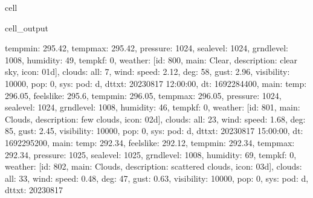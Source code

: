 \documentclass[letterpaper,10pt,english]{jupyterBook}
\begin{document}
\begin{sphinxuseclass}{cell}
\begin{sphinxVerbatimOutput}
\begin{sphinxuseclass}{cell_output}
\begin{sphinxVerbatim}[commandchars=\\\{\}]
\PYGZsq{}temp\PYGZus{}min\PYGZsq{}: 295.42, \PYGZsq{}temp\PYGZus{}max\PYGZsq{}: 295.42, \PYGZsq{}pressure\PYGZsq{}: 1024, \PYGZsq{}sea\PYGZus{}level\PYGZsq{}: 1024, \PYGZsq{}grnd\PYGZus{}level\PYGZsq{}: 1008, \PYGZsq{}humidity\PYGZsq{}: 49, \PYGZsq{}temp\PYGZus{}kf\PYGZsq{}: 0\PYGZcb{}, \PYGZsq{}weather\PYGZsq{}: [\PYGZob{}\PYGZsq{}id\PYGZsq{}: 800, \PYGZsq{}main\PYGZsq{}: \PYGZsq{}Clear\PYGZsq{}, \PYGZsq{}description\PYGZsq{}: \PYGZsq{}clear sky\PYGZsq{}, \PYGZsq{}icon\PYGZsq{}: \PYGZsq{}01d\PYGZsq{}\PYGZcb{}], \PYGZsq{}clouds\PYGZsq{}: \PYGZob{}\PYGZsq{}all\PYGZsq{}: 7\PYGZcb{}, \PYGZsq{}wind\PYGZsq{}: \PYGZob{}\PYGZsq{}speed\PYGZsq{}: 2.12, \PYGZsq{}deg\PYGZsq{}: 58, \PYGZsq{}gust\PYGZsq{}: 2.96\PYGZcb{}, \PYGZsq{}visibility\PYGZsq{}: 10000, \PYGZsq{}pop\PYGZsq{}: 0, \PYGZsq{}sys\PYGZsq{}: \PYGZob{}\PYGZsq{}pod\PYGZsq{}: \PYGZsq{}d\PYGZsq{}\PYGZcb{}, \PYGZsq{}dt\PYGZus{}txt\PYGZsq{}: \PYGZsq{}2023\PYGZhy{}08\PYGZhy{}17 12:00:00\PYGZsq{}\PYGZcb{}, \PYGZob{}\PYGZsq{}dt\PYGZsq{}: 1692284400, \PYGZsq{}main\PYGZsq{}: \PYGZob{}\PYGZsq{}temp\PYGZsq{}: 296.05, \PYGZsq{}feels\PYGZus{}like\PYGZsq{}: 295.6, \PYGZsq{}temp\PYGZus{}min\PYGZsq{}: 296.05, \PYGZsq{}temp\PYGZus{}max\PYGZsq{}: 296.05, \PYGZsq{}pressure\PYGZsq{}: 1024, \PYGZsq{}sea\PYGZus{}level\PYGZsq{}: 1024, \PYGZsq{}grnd\PYGZus{}level\PYGZsq{}: 1008, \PYGZsq{}humidity\PYGZsq{}: 46, \PYGZsq{}temp\PYGZus{}kf\PYGZsq{}: 0\PYGZcb{}, \PYGZsq{}weather\PYGZsq{}: [\PYGZob{}\PYGZsq{}id\PYGZsq{}: 801, \PYGZsq{}main\PYGZsq{}: \PYGZsq{}Clouds\PYGZsq{}, \PYGZsq{}description\PYGZsq{}: \PYGZsq{}few clouds\PYGZsq{}, \PYGZsq{}icon\PYGZsq{}: \PYGZsq{}02d\PYGZsq{}\PYGZcb{}], \PYGZsq{}clouds\PYGZsq{}: \PYGZob{}\PYGZsq{}all\PYGZsq{}: 23\PYGZcb{}, \PYGZsq{}wind\PYGZsq{}: \PYGZob{}\PYGZsq{}speed\PYGZsq{}: 1.68, \PYGZsq{}deg\PYGZsq{}: 85, \PYGZsq{}gust\PYGZsq{}: 2.45\PYGZcb{}, \PYGZsq{}visibility\PYGZsq{}: 10000, \PYGZsq{}pop\PYGZsq{}: 0, \PYGZsq{}sys\PYGZsq{}: \PYGZob{}\PYGZsq{}pod\PYGZsq{}: \PYGZsq{}d\PYGZsq{}\PYGZcb{}, \PYGZsq{}dt\PYGZus{}txt\PYGZsq{}: \PYGZsq{}2023\PYGZhy{}08\PYGZhy{}17 15:00:00\PYGZsq{}\PYGZcb{}, \PYGZob{}\PYGZsq{}dt\PYGZsq{}: 1692295200, \PYGZsq{}main\PYGZsq{}: \PYGZob{}\PYGZsq{}temp\PYGZsq{}: 292.34, \PYGZsq{}feels\PYGZus{}like\PYGZsq{}: 292.12, \PYGZsq{}temp\PYGZus{}min\PYGZsq{}: 292.34, \PYGZsq{}temp\PYGZus{}max\PYGZsq{}: 292.34, \PYGZsq{}pressure\PYGZsq{}: 1025, \PYGZsq{}sea\PYGZus{}level\PYGZsq{}: 1025, \PYGZsq{}grnd\PYGZus{}level\PYGZsq{}: 1008, \PYGZsq{}humidity\PYGZsq{}: 69, \PYGZsq{}temp\PYGZus{}kf\PYGZsq{}: 0\PYGZcb{}, \PYGZsq{}weather\PYGZsq{}: [\PYGZob{}\PYGZsq{}id\PYGZsq{}: 802, \PYGZsq{}main\PYGZsq{}: \PYGZsq{}Clouds\PYGZsq{}, \PYGZsq{}description\PYGZsq{}: \PYGZsq{}scattered clouds\PYGZsq{}, \PYGZsq{}icon\PYGZsq{}: \PYGZsq{}03d\PYGZsq{}\PYGZcb{}], \PYGZsq{}clouds\PYGZsq{}: \PYGZob{}\PYGZsq{}all\PYGZsq{}: 33\PYGZcb{}, \PYGZsq{}wind\PYGZsq{}: \PYGZob{}\PYGZsq{}speed\PYGZsq{}: 0.48, \PYGZsq{}deg\PYGZsq{}: 47, \PYGZsq{}gust\PYGZsq{}: 0.63\PYGZcb{}, \PYGZsq{}visibility\PYGZsq{}: 10000, \PYGZsq{}pop\PYGZsq{}: 0, \PYGZsq{}sys\PYGZsq{}: \PYGZob{}\PYGZsq{}pod\PYGZsq{}: \PYGZsq{}d\PYGZsq{}\PYGZcb{}, \PYGZsq{}dt\PYGZus{}txt\PYGZsq{}: \PYGZsq{}2023\PYGZhy{}08\PYGZhy{}17 
\end{sphinxVerbatim}
\end{sphinxuseclass}
\end{sphinxVerbatimOutput}
\end{sphinxuseclass}
\end{document}
